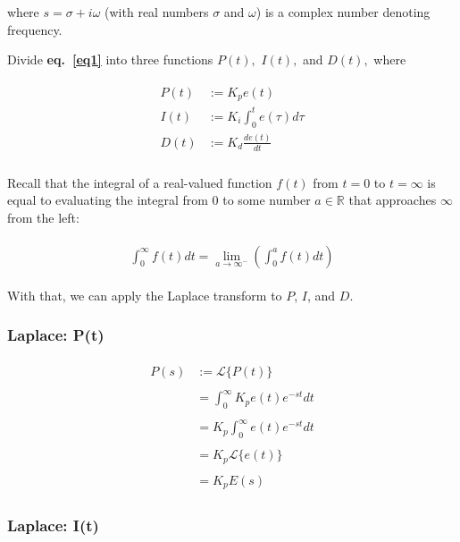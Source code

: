 \documentclass[11pt]{article}
\newcommand{\R}{\mathbb{R}}
\theoremstyle{definition}
\begin{document}
where $s = \sigma + i\omega$ (with real numbers $\sigma$ and $\omega$) is a complex number denoting frequency.

Divide \textbf{eq.~\ref{eq1}} into three functions $P(t),$ $I(t),$ and $D(t),$ where

\begin{align*}
\begin{split}
    P(t) &:= K_{p}e(t) \\
    I(t) &:= K_{i}\int_{0}^{t}e(\tau)d\tau \\
    D(t) &:= K_{d}\frac{de(t)}{dt} \\
\end{split}
\end{align*}

Recall that the integral of a real-valued function $f(t)$ from $t = 0$ to $t = \infty$ is equal to evaluating the integral
from $0$ to some number $a \in \R$ that approaches $\infty$ from the left:

\begin{align*}
\begin{split}
    \int_{0}^{\infty}f(t)dt = \lim_{a\to\infty^{-}}\left(\int_{0}^{a}f(t)dt\right)
\end{split}
\end{align*}


With that, we can apply the Laplace transform to $P$, $I$, and $D$.

\subsubsection{Laplace: P(t)}

\begin{align*}
    \begin{split}
        P(s) &:= \mathcal{L}\{P(t)\} \\\\
             &= \int_{0}^{\infty} K_{p}e(t)e^{-st}dt \\\\
             &= K_{p}\int_{0}^{\infty}e(t)e^{-st}dt \\\\
             &= K_{p}\mathcal{L}\{e(t)\} \\\\
             &= K_{p}E(s)
    \end{split}
\end{align*}

\subsubsection{Laplace: I(t)}
\end{document}
